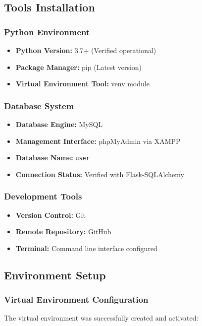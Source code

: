 \documentclass[12pt,a4paper]{article}
\begin{document}
\subsection{Tools Installation}

\subsubsection{Python Environment}
\begin{itemize}
    \item \textbf{Python Version:} 3.7+ (Verified operational)
    \item \textbf{Package Manager:} pip (Latest version)
    \item \textbf{Virtual Environment Tool:} venv module
\end{itemize}

\subsubsection{Database System}
\begin{itemize}
    \item \textbf{Database Engine:} MySQL
    \item \textbf{Management Interface:} phpMyAdmin via XAMPP
    \item \textbf{Database Name:} \texttt{user}
    \item \textbf{Connection Status:} Verified with Flask-SQLAlchemy
\end{itemize}

\subsubsection{Development Tools}
\begin{itemize}
    \item \textbf{Version Control:} Git
    \item \textbf{Remote Repository:} GitHub
    \item \textbf{Terminal:} Command line interface configured
\end{itemize}

\subsection{Environment Setup}

\subsubsection{Virtual Environment Configuration}
The virtual environment was successfully created and activated:
\end{document}
